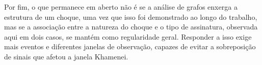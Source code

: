 \documentclass[12pt,a4paper]{article}
\begin{document}
Por fim, o que permanece em aberto não é se a análise de grafos enxerga a estrutura de um choque, uma vez que isso foi demonstrado ao longo do trabalho, mas se a associação entre a natureza do choque e o tipo de assinatura, observada aqui em dois casos, se mantém como regularidade geral. Responder a isso exige mais eventos e diferentes janelas de observação, capazes de evitar a sobreposição de sinais que afetou a janela Khamenei.
\end{document}
